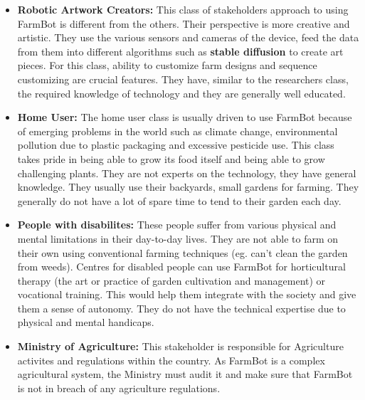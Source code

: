 \begin{itemize}
    \item \textbf{Robotic Artwork Creators:} This class of stakeholders approach to using FarmBot is different from the others. Their perspective is more creative and artistic. They use the various sensors and cameras of the device, feed the data from them into different algorithms such as \textbf{stable diffusion} to create art pieces. For this class, ability to customize farm designs and sequence customizing are crucial features. They have, similar to the researchers class, the required knowledge of technology and they are generally well educated.  

    \item \textbf{Home User:} The home user class is usually driven to use FarmBot because of emerging problems in the world such as climate change, environmental pollution due to plastic packaging and excessive pesticide use. This class takes pride in being able to grow its food itself and being able to grow challenging plants. They are not experts on the technology, they have general knowledge. They usually use their backyards, small gardens for farming. They generally do not have a lot of spare time to tend to their garden each day.

    \item \textbf{People with disabilites:} These people suffer from various physical and mental limitations in their day-to-day lives. They are not able to farm on their own using conventional farming techniques (eg. can't clean the garden from weeds). Centres for disabled people can use FarmBot for horticultural therapy (the art or practice of garden cultivation and management) or vocational training. This would help them integrate with the society and give them a sense of autonomy. They do not have the technical expertise due to physical and mental handicaps. 

    \item \textbf{Ministry of Agriculture:} This stakeholder is responsible for Agriculture activites and regulations within the country. As FarmBot is a complex agricultural system, the Ministry must audit it and make sure that FarmBot is not in breach of any agriculture regulations.
\end{itemize}



